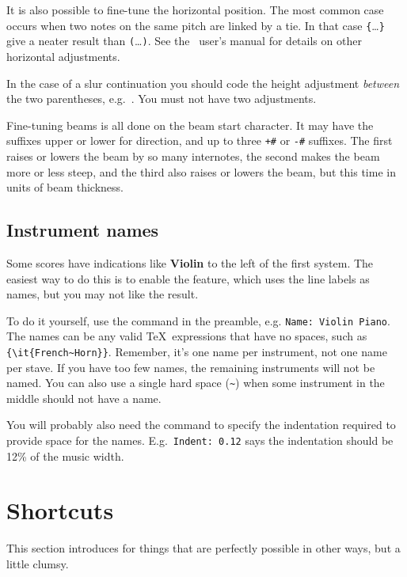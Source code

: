 \documentclass[11pt]{article}
\begin{document}
It is also possible to fine-tune the horizontal position. The most common case 
occurs when two notes on the same pitch are linked by a tie.  In 
that case \verb"{"\ldots\verb"}" give a neater result than \verb"("\ldots\verb")".  
See the \PMX\ user's manual for details on other horizontal adjustments. 

In the case of a slur continuation you should code the height adjustment 
\emph{between} the two parentheses, e.g.~.  You must not have two 
adjustments. 

Fine-tuning beams is all done on the beam start character.  It may have
the suffixes \mark upper or \mark lower for direction, and up to 
three \verb"+#" or \verb"-#" suffixes.  The first raises or lowers the 
beam by so many internotes, the second makes the beam more or less 
steep, and the third also raises or lowers the beam, but this time in 
units of beam thickness.

\subsection{Instrument names}   \label{stavename}

Some scores have indications like \textbf{Violin} to the left of the
first system.  The easiest way to do this is to enable the  feature, 
which uses the line labels as names, but you may not like the result.

To do it yourself, use the  command in the preamble,
e.g. 
\verb"Name: Violin Piano".
The names can be any valid \TeX\ expressions that have no spaces, such as
\verb"{\it{French~Horn}}".
Remember, it's one name per instrument, not one name per stave.  If you
have too few names, the remaining instruments will not be named.
You can
also use a single hard space (\verb"~") when some instrument in the middle 
should not have a name.

You will probably also need the  command to specify the
indentation required to provide space for the names.  
E.g.\ \verb"Indent: 0.12" says the indentation should be 12\% of the music
width.  


\section{Shortcuts}

This section introduces  for things that are perfectly
possible in other ways, but a little clumsy.
\end{document}
